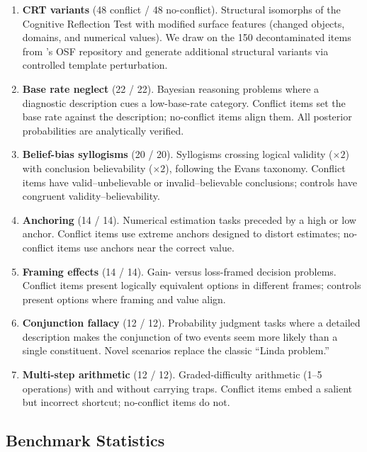 \begin{enumerate}[leftmargin=*,itemsep=1pt]
  \item \textbf{CRT variants} (48 conflict / 48 no-conflict).  Structural
  isomorphs of the Cognitive Reflection Test with modified surface features
  (changed objects, domains, and numerical values).  We draw on the 150
  decontaminated items from \citet{hagendorff2023human}'s OSF repository and
  generate additional structural variants via controlled template perturbation.

  \item \textbf{Base rate neglect} (22 / 22).  Bayesian reasoning problems
  where a diagnostic description cues a low-base-rate category.  Conflict
  items set the base rate against the description; no-conflict items align
  them.  All posterior probabilities are analytically verified.

  \item \textbf{Belief-bias syllogisms} (20 / 20).  Syllogisms crossing
  logical validity ($\times 2$) with conclusion believability ($\times 2$),
  following the Evans taxonomy.  Conflict items have valid--unbelievable or
  invalid--believable conclusions; controls have congruent
  validity--believability.

  \item \textbf{Anchoring} (14 / 14).  Numerical estimation tasks preceded by
  a high or low anchor.  Conflict items use extreme anchors designed to
  distort estimates; no-conflict items use anchors near the correct value.

  \item \textbf{Framing effects} (14 / 14).  Gain- versus loss-framed
  decision problems.  Conflict items present logically equivalent options in
  different frames; controls present options where framing and value align.

  \item \textbf{Conjunction fallacy} (12 / 12).  Probability judgment tasks
  where a detailed description makes the conjunction of two events seem more
  likely than a single constituent.  Novel scenarios replace the classic
  ``Linda problem.''

  \item \textbf{Multi-step arithmetic} (12 / 12).  Graded-difficulty
  arithmetic (1--5 operations) with and without carrying traps.  Conflict
  items embed a salient but incorrect shortcut; no-conflict items do not.
\end{enumerate}

\subsection{Benchmark Statistics}

